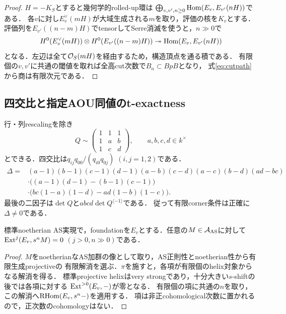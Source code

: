 \begin{proof}
$H=-K_S$とすると幾何学的rolled-up環は
$\bigoplus_{v,v',n\ge0}\operatorname{Hom}(E_v,E_{v'}(nH))$である\cite[(4.9)]{AOU}．
各$v$に対し$E_v^\vee(mH)$が大域生成される$m$を取り，評価の核を$K_v$とする．
評価列を$E_{v'}((n-m)H)$でtensorしてSerre消滅を使うと，$n\gg0$で
\[
 H^0(E_v^\vee(mH))\otimes H^0(E_{v'}((n-m)H))
 \twoheadrightarrow\operatorname{Hom}(E_v,E_{v'}(nH))
\]
となる．左辺は全て$\mathcal O_S(mH)$を経由するため，構造頂点を通る積である．
有限個の$v,v'$に共通の閾値を取れば全高cut次数で$B_n\subset BpB$となり，
式\eqref{eq:cutpath}から商は有限次元である．
\end{proof}

\subsection{四交比と指定AOU同値のt-exactness}
行・列rescalingを除き
\[
 Q\sim\begin{pmatrix}1&1&1\\1&a&b\\1&c&d\end{pmatrix},
\qquad a,b,c,d\in k^\times
\]
とできる．四交比は$q_{ij}q_{00}/(q_{i0}q_{0j})$ $(i,j=1,2)$である．
\begin{equation}\label{eq:Deltaheart}
\begin{split}
\Delta={}&(a-1)(b-1)(c-1)(d-1)(a-b)(c-d)(a-c)(b-d)(ad-bc)\\
&\cdot\bigl((a-1)(d-1)-(b-1)(c-1)\bigr)\\
&\cdot\bigl(bc(1-a)(1-d)-ad(1-b)(1-c)\bigr).
\end{split}
\end{equation}
最後の二因子は$\det Q$と$abcd\det Q^{\langle-1\rangle}$である．
従って有限corner条件は正確に$\Delta\ne0$である．

\begin{lemma}\label{lem:ASfulltail}
標準noetherian AS実現で，foundationを$E_v$とする．任意の$M\in\mathcal A_{\mathrm{AS}}$に対して
$\operatorname{Ext}^j(E_v,s^nM)=0$ $(j>0,n\gg0)$である．
\end{lemma}
\begin{proof}
$M$をnoetherianなAS加群の像として取り，AS正則性とnoetherian性から有限生成projectiveの
有限解消を選ぶ．$\pi$を施すと，各項が有限個のhelix対象からなる解消を得る．
標準projective helixはvery strongであり，十分大きい$s$-shiftの後では各項に対する
$\operatorname{Ext}^{>0}(E_v,-)$が零となる\cite[Definition 3.1と(3.10)の直前]{OU}．
有限個の項に共通の$n$を取り，この解消へ$\operatorname{RHom}(E_v,s^n-)$を適用する．
項は非正cohomological次数に置かれるので，正次数のcohomologyはない．
\end{proof}

